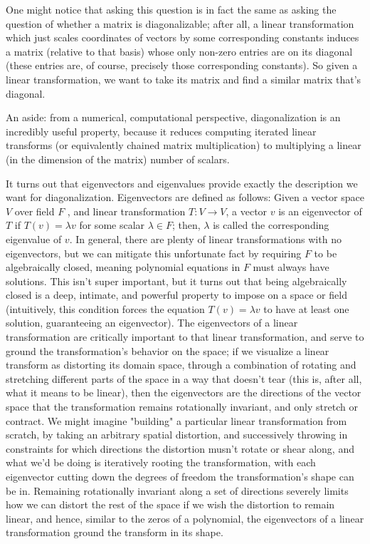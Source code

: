 \documentclass{article}
\newcommand{\n}{\leavevmode \newline}
\newcommand{\nn}{\leavevmode \newline \newline}
\begin{document}
\nn
One might notice that asking this question is in fact the same as asking the question of whether a matrix is diagonalizable; after all, a linear transformation which just scales coordinates of vectors by some corresponding constants induces a matrix (relative to that basis) whose only non-zero entries are on its diagonal (these entries are, of course, precisely those corresponding constants). So given a linear transformation, we want to take its matrix and find a similar matrix that's diagonal.
\n
\begin{adjustwidth}{1cm}{1cm}
    An aside: from a numerical, computational perspective, diagonalization is an incredibly useful property, because it reduces computing iterated linear transforms (or equivalently chained matrix multiplication) to multiplying a linear (in the dimension of the matrix) number of scalars.
\end{adjustwidth}
\n
It turns out that eigenvectors and eigenvalues provide exactly the description we want for diagonalization. Eigenvectors are defined as follows: Given a vector space $ V $ over field $ F $ , and linear transformation $ T: V \rightarrow V $, a vector $ v $ is an eigenvector of $ T $ if $ T(v) = \lambda v $ for some scalar $ \lambda \in F $; then, $ \lambda $ is called the corresponding eigenvalue of $ v $. In general, there are plenty of linear transformations with no eigenvectors, but we can mitigate this unfortunate fact by requiring $ F $ to be algebraically closed, meaning polynomial equations in $ F $ must always have solutions. This isn't super important, but it turns out that being algebraically closed is a deep, intimate, and powerful property to impose on a space or field (intuitively, this condition forces the equation $ T(v) = \lambda v $ to have at least one solution, guaranteeing an eigenvector). The eigenvectors of a linear transformation are critically important to that linear transformation, and serve to ground the transformation's behavior on the space; if we visualize a linear transform as distorting its domain space, through a combination of rotating and stretching different parts of the space in a way that doesn't tear (this is, after all, what it means to be linear), then the eigenvectors are the directions of the vector space that the transformation remains rotationally invariant, and only stretch or contract. We might imagine "building" a particular linear transformation from scratch, by taking an arbitrary spatial distortion, and successively throwing in constraints for which directions the distortion musn't rotate or shear along, and what we'd be doing is iteratively rooting the transformation, with each eigenvector cutting down the degrees of freedom the transformation's shape can be in. Remaining rotationally invariant along a set of directions severely limits how we can distort the rest of the space if we wish the distortion to remain linear, and hence, similar to the zeros of a polynomial, the eigenvectors of a linear transformation ground the transform in its shape.
\end{document}
